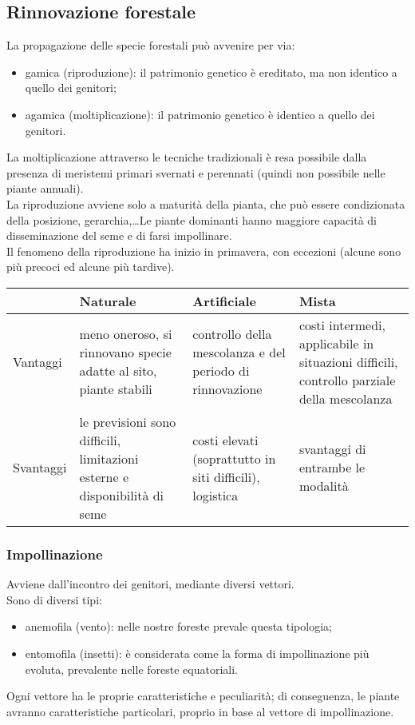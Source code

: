\documentclass{article}
\begin{document}
\subsection{Rinnovazione forestale}
La propagazione delle specie forestali può avvenire per via:
\begin{itemize}
    \item gamica (riproduzione): il patrimonio genetico è ereditato, ma non identico a quello dei genitori;
    \item agamica (moltiplicazione): il patrimonio genetico è identico a quello dei genitori.
\end{itemize}
La moltiplicazione attraverso le tecniche tradizionali è resa possibile dalla presenza di meristemi primari svernati e perennati (quindi non possibile nelle piante annuali).\\
La riproduzione avviene solo a maturità della pianta, che può essere condizionata della posizione, gerarchia,\dots Le piante dominanti hanno maggiore capacità di disseminazione del seme e di farsi impollinare.\\
Il fenomeno della riproduzione ha inizio in primavera, con eccezioni (alcune sono più precoci ed alcune più tardive).
\begin{table}[h]\centering 
\begin{tabular}{p{1.4cm}p{4cm}p{4cm}p{4cm}}
 & Naturale & Artificiale & Mista \\
 \midrule
Vantaggi  &  meno oneroso, si rinnovano specie adatte al sito, piante stabili & controllo della mescolanza e del periodo di rinnovazione   &  costi intermedi, applicabile in situazioni difficili, controllo parziale della mescolanza     \\
Svantaggi &le previsioni sono difficili, limitazioni esterne e disponibilità di seme  & costi elevati (soprattutto in siti difficili), logistica & svantaggi di entrambe le modalità      
\end{tabular}
\end{table}
\subsubsection{Impollinazione}
Avviene dall'incontro dei genitori, mediante diversi vettori.\\
Sono di diversi tipi:
\begin{itemize}
    \item anemofila (vento): nelle nostre foreste prevale questa tipologia;
    \item entomofila (insetti): è considerata come la forma di impollinazione più evoluta, prevalente nelle foreste equatoriali.
\end{itemize}
Ogni vettore ha le proprie caratteristiche e peculiarità; di conseguenza, le piante avranno caratteristiche particolari, proprio in base al vettore di impollinazione.
\end{document}
